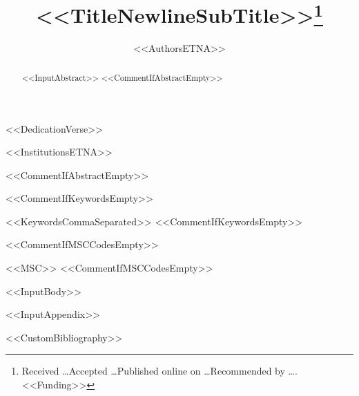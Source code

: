\documentclass[%
leqno,
letterpaper,
<<DocumentClassOptions>>]{etna-scoop}
\title{<<TitleNewlineSubTitle>>\thanks{Received \ldots Accepted \ldots Published online on \ldots Recommended by \ldots. <<Funding>>}}
\author{<<AuthorsETNA>>}
\begin{document}
\maketitle

<<DedicationVerse>>

\renewcommand{\thefootnote}{\fnsymbol{footnote}}
<<InstitutionsETNA>>

<<CommentIfAbstractEmpty>>\begin{abstract}
<<InputAbstract>>
<<CommentIfAbstractEmpty>>\end{abstract}

<<CommentIfKeywordsEmpty>>\begin{keywords}
<<KeywordsCommaSeparated>>
<<CommentIfKeywordsEmpty>>\end{keywords}

<<CommentIfMSCCodesEmpty>>\begin{AMS}
<<MSC>>
<<CommentIfMSCCodesEmpty>>\end{AMS}

<<InputBody>>

\appendix
<<InputAppendix>>


<<CustomBibliography>>
\end{document}
